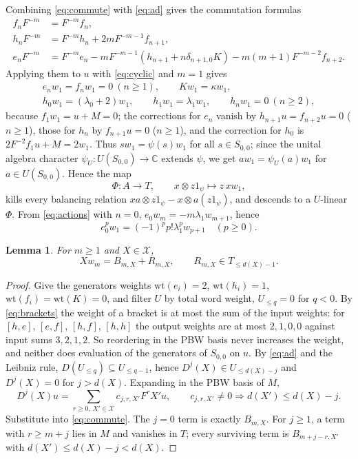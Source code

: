 \documentclass[11pt,a4paper]{article}
\newcommand{\C}{\mathbb C}
\newcommand{\X}{\mathcal X}
\newtheorem{lemma}[theorem]{Lemma}
\begin{document}
Combining \eqref{eq:commute} with \eqref{eq:ad} gives the commutation
formulas
\begin{equation}\label{eq:actions}
\begin{aligned}
 f_nF^{-m}&=F^{-m}f_n,\\
 h_nF^{-m}&=F^{-m}h_n+2mF^{-m-1}f_{n+1},\\
 e_nF^{-m}&=F^{-m}e_n-mF^{-m-1}(h_{n+1}+n\delta_{n+1,0}K)
 -m(m+1)F^{-m-2}f_{n+2}.
\end{aligned}
\end{equation}
Applying them to $u$ with \eqref{eq:cyclic} and $m=1$ gives
\begin{equation}\label{eq:w1}
\begin{gathered}
 e_nw_1=f_nw_1=0\ (n\ge1),\qquad Kw_1=\kappa w_1,\\
 h_0w_1=(\lambda_0+2)w_1,\qquad h_1w_1=\lambda_1w_1,\qquad
 h_nw_1=0\ (n\ge2),
\end{gathered}
\end{equation}
because $f_1w_1=u+M=0$; the corrections for $e_n$ vanish by
$h_{n+1}u=f_{n+2}u=0$ ($n\ge1$), those for $h_n$ by $f_{n+1}u=0$
($n\ge1$), and the correction for $h_0$ is $2F^{-2}f_1u+M=2w_1$. Thus
$sw_1=\psi(s)w_1$ for all $s\in S_{0,0}$; since the unital algebra
character $\psi_U:U(S_{0,0})\to\C$ extends $\psi$, we get
$aw_1=\psi_U(a)w_1$ for $a\in U(S_{0,0})$. Hence the map
\[
 \Phi:A\longrightarrow T,\qquad x\otimes z1_\psi\longmapsto z\,xw_1,
\]
kills every balancing relation
$x a\otimes z1_\psi-x\otimes a(z1_\psi)$, and descends to a $U$-linear
$\Phi$. From \eqref{eq:actions} with $n=0$,
$e_0w_m=-m\lambda_1w_{m+1}$, hence
\begin{equation}\label{eq:tower}
 e_0^pw_1=(-1)^pp!\lambda_1^pw_{p+1}\quad(p\ge0).
\end{equation}
\begin{lemma}\label{lem:lower}
For $m\ge1$ and $X\in\X$,
\[
 Xw_m=B_{m,X}+R_{m,X},\qquad R_{m,X}\in T_{\le d(X)-1}.
\]
\end{lemma}
\begin{proof}
Give the generators weights $\mathrm{wt}(e_i)=2$, $\mathrm{wt}(h_i)=1$,
$\mathrm{wt}(f_i)=\mathrm{wt}(K)=0$, and filter $U$ by total word weight,
$U_{\le q}=0$ for $q<0$. By \eqref{eq:brackets} the weight of a bracket is
at most the sum of the input weights: for $[h,e]$, $[e,f]$, $[h,f]$, $[h,h]$
the output weights are at most $2,1,0,0$ against input sums $3,2,1,2$. So
reordering in the PBW basis never increases the weight, and neither does
evaluation of the generators of $S_{0,0}$ on $u$. By \eqref{eq:ad} and the
Leibniz rule, $D(U_{\le q})\subseteq U_{\le q-1}$, hence
$D^j(X)\in U_{\le d(X)-j}$ and $D^j(X)=0$ for $j>d(X)$. Expanding in the
PBW basis of $M$,
\[
 D^j(X)u=\sum_{r\ge0,\,X'\in\X}c_{j,r,X'}F^rX'u,\qquad
 c_{j,r,X'}\ne0\Rightarrow d(X')\le d(X)-j.
\]
Substitute into \eqref{eq:commute}. The $j=0$ term is exactly $B_{m,X}$.
For $j\ge1$, a term with $r\ge m+j$ lies in $M$ and vanishes in $T$; every
surviving term is $B_{m+j-r,X'}$ with $d(X')\le d(X)-j<d(X)$.
\end{proof}
\end{document}
